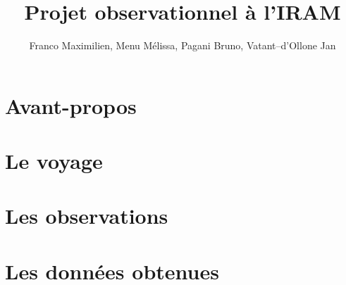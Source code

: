 \documentclass[a4paper,11pt]{article}
\author{Franco Maximilien, Menu Mélissa, Pagani Bruno, Vatant--d'Ollone Jan}
\date{}
\title{Projet observationnel à l'IRAM}
\begin{document}
\maketitle

\section{Avant-propos}

\section{Le voyage}

\section{Les observations}

\section{Les données obtenues}
\end{document}
